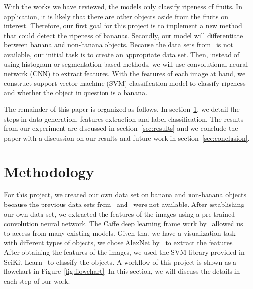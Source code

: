 \documentclass{article} %
\begin{document}
With the works we have reviewed, the models only classify ripeness of fruits. In application, it is likely that there are other objects aside from the fruits on interest. Therefore, our first goal for this project is to implement a new method that could detect the ripeness of bananas. Secondly, our model will differentiate between banana and non-banana objects. Because the data sets from~\citet{paulraj2009color} is not available, our initial task is to create an appropriate data set. Then, instead of using histogram or segmentation based methods, we will use convolutional neural network (CNN) to extract features. With the features of each image at hand, we construct support vector machine (SVM) classification model to classify ripeness and whether the object in question is a banana. 

The remainder of this paper is organized as follows. In section~\ref{sec:method}, we detail the steps in data generation, features extraction and label classification. The results from our experiment are discussed in section~\ref{sec:results} and we conclude the paper with a discussion on our results and future work in section~\ref{sec:conclusion}. 

\section{Methodology}
\label{sec:method}
For this project, we created our own data set on banana and non-banana objects because the previous data sets from~\citet{saad2009recognizing} and~\citet{paulraj2009color} were not available. After establishing our own data set, we extracted the features of the images using a pre-trained convolution neural network. The Caffe deep learning frame work by~\citet{jia2014caffe} allowed us to access from many existing models. Given that we have a visualization task with different types of objects, we chose AlexNet by~\citet{krizhevsky2012imagenet} to extract the features. After obtaining the features of the images, we used the SVM library provided in SciKit Learn~\citep{scikit-learn} to classify the objects. A workflow of this project is shown as a flowchart in Figure~\ref{fig:flowchart}. In this section, we will discuss the details in each step of our work. 
\end{document}
